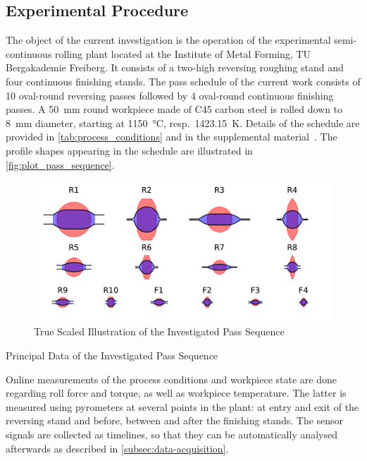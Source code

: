 \subsection{Experimental Procedure}\label{subsec:experimental-procedure}

The object of the current investigation is the operation of the experimental semi-continuous rolling plant located at the Institute of Metal Forming, TU Bergakademie Freiberg.
It consists of a two-high reversing roughing stand and four continuous finishing stands.
The pass schedule of the current work consists of 10 oval-round reversing passes followed by 4 oval-round continuous finishing passes.
A \qty{50}{\milli\meter} round workpiece made of C45 carbon steel is rolled down to \qty{8}{\milli\meter} diameter, starting at \qty{1150}{\celsius}, resp.\ \qty{1423.15}{\kelvin}.
Details of the schedule are provided in \autoref{tab:process_conditions} and in the supplemental material~\cite{WeinerVariationSupplemental2024}.
The profile shapes appearing in the schedule are illustrated in \autoref{fig:plot_pass_sequence}.

\begin{figure}
    \centering
    \includegraphics{img/plot_pass_sequence}
    \caption{True Scaled Illustration of the Investigated Pass Sequence}
    \label{fig:plot_pass_sequence}
\end{figure}


\begin{table}
    \centering
    \caption{Principal Data of the Investigated Pass Sequence}
    \label{tab:process_conditions}
    
\end{table}

Online measurements of the process conditions and workpiece state are done regarding roll force and torque, as well as workpiece temperature.
The latter is measured using pyrometers at several points in the plant: at entry and exit of the reversing stand and before, between and after the finishing stands.
The sensor signals are collected as timelines, so that they can be automatically analysed afterwards as described in \autoref{subsec:data-acquisition}.

